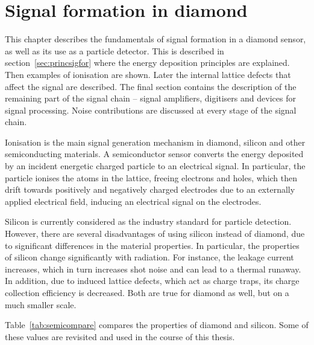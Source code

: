 
\chapter{Signal formation in diamond}
\label{ch:diamond}

This chapter describes the fundamentals of signal formation in a diamond sensor, as well as its use as a particle detector. This is described in section~\ref{sec:princsigfor} where the energy deposition principles are explained. Then examples of ionisation are shown. Later the internal lattice defects that affect the signal are described. The final section contains the description of the remaining part of the signal chain -- signal amplifiers, digitisers and devices for signal processing. Noise contributions are discussed at every stage of the signal chain.

Ionisation is the main signal generation mechanism in diamond, silicon and other semiconducting materials. A semiconductor sensor converts the energy deposited by an incident energetic charged particle to an electrical signal. In particular, the particle ionises the atoms in the lattice, freeing electrons and holes, which then drift towards positively and negatively charged electrodes due to an externally applied electrical field, inducing an electrical signal on the electrodes. 

Silicon is currently considered as the industry standard for particle detection. However, there are several disadvantages of using silicon instead of diamond, due to significant differences in the material properties. In particular, the properties of silicon change significantly with radiation. For instance, the leakage current increases, which in turn increases shot noise and can lead to a thermal runaway. In addition, due to induced lattice defects, which act as charge traps, its charge collection efficiency is decreased. Both are true for diamond as well, but on a much smaller scale.

Table~\ref{tab:semicompare} compares the properties of diamond and silicon. Some of these values are revisited and used in the course of this thesis. 


